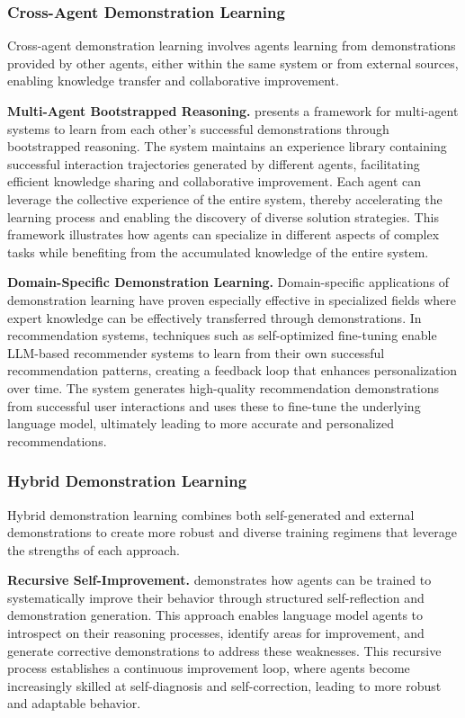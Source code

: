 \subsubsection{Cross-Agent Demonstration Learning}

Cross-agent demonstration learning involves agents learning from demonstrations provided by other agents, either within the same system or from external sources, enabling knowledge transfer and collaborative improvement.


\textbf{Multi-Agent Bootstrapped Reasoning.} 
\cite{zhao2025sirius} presents a framework for multi-agent systems to learn from each other’s successful demonstrations through bootstrapped reasoning. The system maintains an experience library containing successful interaction trajectories generated by different agents, facilitating efficient knowledge sharing and collaborative improvement. Each agent can leverage the collective experience of the entire system, thereby accelerating the learning process and enabling the discovery of diverse solution strategies. This framework illustrates how agents can specialize in different aspects of complex tasks while benefiting from the accumulated knowledge of the entire system.

\textbf{Domain-Specific Demonstration Learning.} 
Domain-specific applications of demonstration learning have proven especially effective in specialized fields where expert knowledge can be effectively transferred through demonstrations. In recommendation systems, techniques such as self-optimized fine-tuning \citep{tang2025bridging} enable LLM-based recommender systems to learn from their own successful recommendation patterns, creating a feedback loop that enhances personalization over time. The system generates high-quality recommendation demonstrations from successful user interactions and uses these to fine-tune the underlying language model, ultimately leading to more accurate and personalized recommendations.

\subsubsection{Hybrid Demonstration Learning}

Hybrid demonstration learning combines both self-generated and external demonstrations to create more robust and diverse training regimens that leverage the strengths of each approach.

\textbf{Recursive Self-Improvement.} 
\cite{qu2024recursive} demonstrates how agents can be trained to systematically improve their behavior through structured self-reflection and demonstration generation. This approach enables language model agents to introspect on their reasoning processes, identify areas for improvement, and generate corrective demonstrations to address these weaknesses. This recursive process establishes a continuous improvement loop, where agents become increasingly skilled at self-diagnosis and self-correction, leading to more robust and adaptable behavior.


